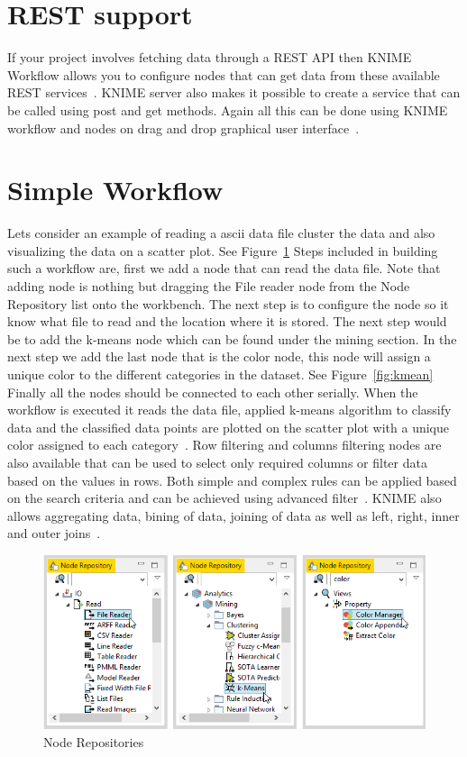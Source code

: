 \section{REST support}

If your project involves fetching data through a REST API then KNIME
Workflow allows you to configure nodes that can get data from these
available REST services~\cite{hid-sp18-517-knimeapi}.  KNIME server
also makes it possible to create a service that can be called using
post and get methods.  Again all this can be done using KNIME workflow
and nodes on drag and drop graphical user
interface~\cite{hid-sp18-517-knimerest}.

\section{Simple Workflow}
Lets consider an example of reading a ascii data file cluster the data 
and also visualizing the data on a scatter plot. See Figure~\ref{fig:noderep}
Steps included in building 
such a workflow are, first we add a node that can read the data file. 
Note that adding node is nothing but dragging the File reader node from 
the Node Repository list onto the workbench. The next step is to configure 
the node so it know what file to read and the location where it is stored. 
The next step would be to add the k-means node which can be found under 
the mining section. In the next step we add the last node that is the color 
node, this node will assign a unique color to the different categories in the 
dataset. See Figure~\ref{fig:kmean} Finally all the nodes should be 
connected to each other serially. When the workflow is executed it reads the data file, applied k-means 
algorithm to classify data and the classified data points are plotted on the 
scatter plot with a unique color assigned to each category~\cite{hid-sp18-517-wf}.
Row filtering and columns filtering nodes are also available that can be
used to select only required columns or filter data based on the values 
in rows. Both simple and complex rules can be applied based on the 
search criteria and can be achieved using advanced filter~\cite{hid-sp18-517-filters}. 
KNIME also allows aggregating data, bining of data, joining of data as well 
as left, right, inner and outer joins~\cite{hid-sp18-517-join}.

\begin{figure}[!ht]
	\centering\includegraphics[width=\columnwidth]{../images/node_repositories.png}
	\caption{Node Repositories~\cite{hid-sp18-517-wf}}
 	\label{fig:noderep}
\end{figure}

